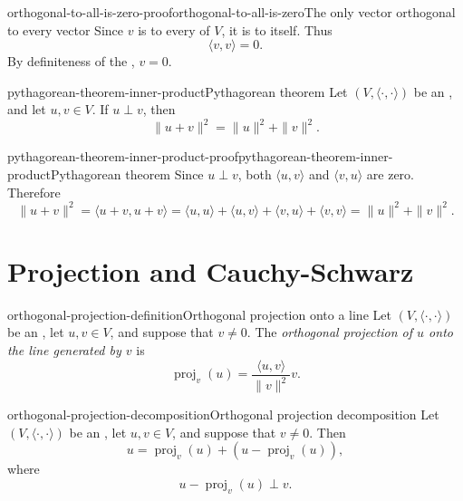 \documentclass[preview]{standalone}
\begin{document}
\begin{snippetproof}{orthogonal-to-all-is-zero-proof}{orthogonal-to-all-is-zero}{The only vector orthogonal to every vector}
    Since \(v\) is \orthogonal to every \vector of \(V\), it is
    \orthogonal to itself. Thus
    \[
        \langle v,v\rangle=0.
    \]
    By definiteness of the \innerproduct, \(v=0\).
\end{snippetproof}

\begin{snippettheorem}{pythagorean-theorem-inner-product}{Pythagorean theorem}
    Let \((V,\langle\cdot,\cdot\rangle)\) be an \innerproductspace, and let
    \(u,v\in V\). If \(u\perp v\), then
    \[
        \|u+v\|^2=\|u\|^2+\|v\|^2.
    \]
\end{snippettheorem}

\begin{snippetproof}{pythagorean-theorem-inner-product-proof}{pythagorean-theorem-inner-product}{Pythagorean theorem}
    Since \(u\perp v\), both \(\langle u,v\rangle\) and
    \(\langle v,u\rangle\) are zero. Therefore
    \[
        \|u+v\|^2
        =
        \langle u+v,u+v\rangle
        =
        \langle u,u\rangle+\langle u,v\rangle+\langle v,u\rangle+\langle v,v\rangle
        =
        \|u\|^2+\|v\|^2.
    \]
\end{snippetproof}

\section{Projection and Cauchy-Schwarz}

\begin{snippetdefinition}{orthogonal-projection-definition}{Orthogonal projection onto a line}
    Let \((V,\langle\cdot,\cdot\rangle)\) be an \innerproductspace, let
    \(u,v\in V\), and suppose that \(v\neq0\). The \emph{orthogonal
    projection of \(u\) onto the line generated by \(v\)} is
    \[
        \operatorname{proj}_v(u)
        =
        \frac{\langle u,v\rangle}{\|v\|^2}v.
    \]
\end{snippetdefinition}

\begin{snippetproposition}{orthogonal-projection-decomposition}{Orthogonal projection decomposition}
    Let \((V,\langle\cdot,\cdot\rangle)\) be an \innerproductspace, let
    \(u,v\in V\), and suppose that \(v\neq0\). Then
    \[
        u=
        \operatorname{proj}_v(u)
        +
        \left(u-\operatorname{proj}_v(u)\right),
    \]
    where
    \[
        u-\operatorname{proj}_v(u)\perp v.
    \]
\end{snippetproposition}
\end{document}
